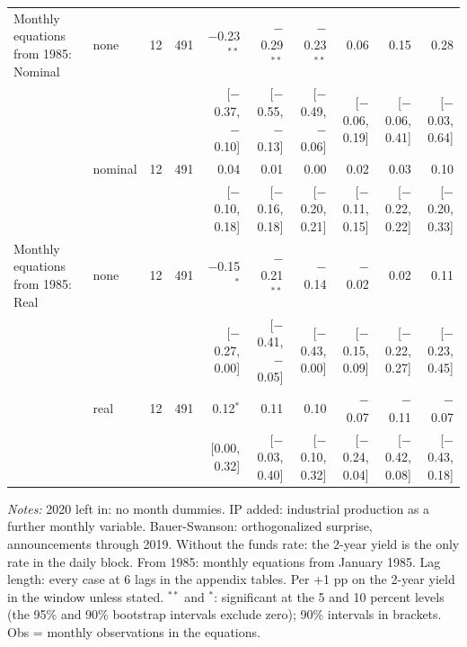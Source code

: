 \begin{table}[tp]
{\begin{tabular}{llcrrrrrrr}
\addlinespace
Monthly equations from 1985: Nominal & none & 12 & 491 & $-$0.23$^{**}$ & $-$0.29$^{**}$ & $-$0.23$^{**}$ & 0.06 & 0.15 & 0.28\\
 & & & & {\scriptsize [$-$0.37, $-$0.10]} & {\scriptsize [$-$0.55, $-$0.13]} & {\scriptsize [$-$0.49, $-$0.06]} & {\scriptsize [$-$0.06, 0.19]} & {\scriptsize [$-$0.06, 0.41]} & {\scriptsize [$-$0.03, 0.64]}\\
 & nominal & 12 & 491 & 0.04 & 0.01 & 0.00 & 0.02 & 0.03 & 0.10\\
 & & & & {\scriptsize [$-$0.10, 0.18]} & {\scriptsize [$-$0.16, 0.18]} & {\scriptsize [$-$0.20, 0.21]} & {\scriptsize [$-$0.11, 0.15]} & {\scriptsize [$-$0.22, 0.22]} & {\scriptsize [$-$0.20, 0.33]}\\
\addlinespace
Monthly equations from 1985: Real & none & 12 & 491 & $-$0.15$^{*}$ & $-$0.21$^{**}$ & $-$0.14 & $-$0.02 & 0.02 & 0.11\\
 & & & & {\scriptsize [$-$0.27, 0.00]} & {\scriptsize [$-$0.41, $-$0.05]} & {\scriptsize [$-$0.43, 0.00]} & {\scriptsize [$-$0.15, 0.09]} & {\scriptsize [$-$0.22, 0.27]} & {\scriptsize [$-$0.23, 0.45]}\\
 & real & 12 & 491 & 0.12$^{*}$ & 0.11 & 0.10 & $-$0.07 & $-$0.11 & $-$0.07\\
 & & & & {\scriptsize [0.00, 0.32]} & {\scriptsize [$-$0.03, 0.40]} & {\scriptsize [$-$0.10, 0.32]} & {\scriptsize [$-$0.24, 0.04]} & {\scriptsize [$-$0.42, 0.08]} & {\scriptsize [$-$0.43, 0.18]}\\
\bottomrule\end{tabular}}
\begin{flushleft}\footnotesize\textit{Notes:} 2020 left in: no month dummies. IP added: industrial production as a further monthly variable. Bauer-Swanson: orthogonalized surprise, announcements through 2019. Without the funds rate: the 2-year yield is the only rate in the daily block. From 1985: monthly equations from January 1985. Lag length: every case at 6 lags in the appendix tables. Per +1 pp on the 2-year yield in the window unless stated. $^{**}$ and $^{*}$: significant at the 5 and 10 percent levels (the 95\% and 90\% bootstrap intervals exclude zero); 90\% intervals in brackets. Obs = monthly observations in the equations.\end{flushleft}
\end{table}
